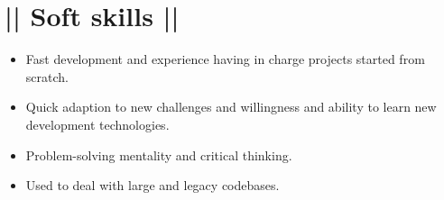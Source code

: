 \section*{|| Soft skills ||}
	\begin{itemize}
		\item Fast development and experience having in charge projects started from scratch.
		\item Quick adaption to new challenges and willingness and ability to learn new development technologies.
		\item Problem-solving mentality and critical thinking.
		\item Used to deal with large and legacy codebases.
	\end{itemize}